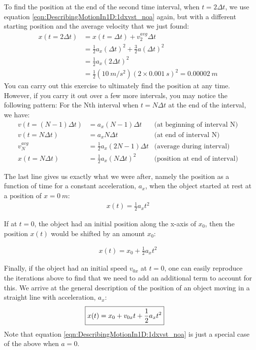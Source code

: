 To find the position at the end of the second time interval, when $t=2\Delta t$, we use equation \ref{eqn:DescribingMotionIn1D:1dxvst_noa} again, but with a different starting position and the average velocity that we just found:
\begin{align*}
x(t=2\Delta t) &= x(t=\Delta t) +v_2^{avg}\Delta t\\
&= \frac{1}{2}a_x(\Delta t)^2+\frac{3}{2}a(\Delta t)^2\\
&= \frac{1}{2}a_x(2\Delta t)^2\\
&=\frac{1}{2}(\SI{10}{m/s^2})(2\times\SI{0.001}{s})^2=\SI{0.00002}{m}
\end{align*}
You can carry out this exercise to ultimately find the position at any time. However, if you carry it out over a few more intervals, you may notice the following pattern: For the Nth interval when $t=N\Delta t$ at the end of the interval, we have:
\begin{align*}
v(t=(N-1)\Delta t) &= a_x (N-1) \Delta t &\text{(at beginning of interval N)}\\
v(t=N\Delta t) &= a_x N \Delta t &\text{(at end of interval N)}\\
v_N^{avg}&=\frac{1}{2}a_x(2N-1)\Delta t&\text{(average during interval)}\\
x(t=N\Delta t)&=\frac{1}{2}a_x(N\Delta t)^2&\text{(position at end of interval)}
\end{align*}

The last line gives us exactly what we were after, namely the position as a function of time for a constant acceleration, $a_x$, when the object started at rest at a position of $x=\SI{0}{m}$:
\begin{align}
\label{eqn:DescribingMotionIn1D:1dxoft_novonoxo}
 x(t) = \frac{1}{2} a_x t^2
\end{align}

If at $t=0$, the object had an initial position along the x-axis of $x_0$, then the position $x(t)$ would be shifted by an amount $x_0$:

\begin{align}
\label{eqn:DescribingMotionIn1D:1dxoft_novo}
 x(t) = x_0+\frac{1}{2} a_x t^2
\end{align}

Finally, if the object had an initial speed $v_{0x}$ at $t=0$, one can easily reproduce the iterations above to find that we need to add an additional term to account for this. We arrive at the general description of the position of an object moving in a straight line with acceleration, $a_x$:
\begin{align}
\label{eqn:DescribingMotionIn1D:1dxvst}
\Aboxed{ x(t) = x_0+v_{0x}t+ \frac{1}{2}a_xt^2}
\end{align}
Note that equation \ref{eqn:DescribingMotionIn1D:1dxvst_noa} is just a special case of the above when $a=0$. 

